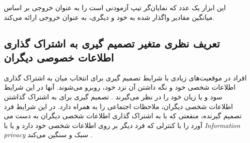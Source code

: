 این ابزار یک عدد که نمایان‌گر تیپ آزمودنی است را به عنوان خروجی بر اساس میانگین مقادیر واگذار شده به خود و دیگری، 
به عنوان خروجی ارائه می‌کند.
\subsection*{تعریف نظری متغیر تصمیم گیری به اشتراک گذاری اطلاعات خصوصی دیگران}
افراد در موقعیت‌های زیادی با شرایط تصمیم گیری برای انتخاب میان
به اشتراک گذاری اطلاعات شخصی خود و نگه داشتن آن نزد خود، روبرو می‌شوند.
آنها در این شرایط سود و یا زیان خود را در نظر می‌گیرند
\!\citep{dinevExtendedPrivacyCalculus2006b,dienlinExtendedPrivacyCalculus2016}
\!.
تصمیم‌ گیری برای به  اشتراک گذاشتن اطلاعات شخصی دیگران، ملاحظات اجتماعی را به همراه دارد.
در این شرایط فرد تصمیم گیرنده، منفعتی که با به اشتراک گذاری اطلاعات شخصی دیگران به دست می آورد را
با کنترلی که فرد دیگر بر روی اطلاعات شخصی خود دارد و یا با
\textit{
    \gls{Information privacy}
}
سبک و سنگین می‌کند
\!
\!\citep{kamleitnerYourDataMy2019,puModelFactorsInfluencing2016}
\!.
